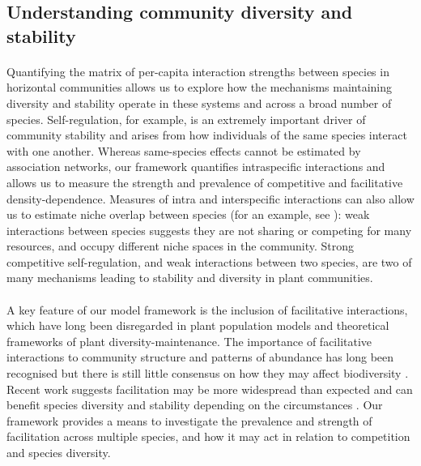 \documentclass[a4,12pt]{article}
\begin{document}
    \subsection{Understanding community diversity and stability}

        \paragraph{}
        Quantifying the matrix of per-capita interaction strengths between species in horizontal communities allows us to explore how the mechanisms maintaining diversity and stability operate in these systems and across a broad number of species. Self-regulation, for example, is an extremely important driver of community stability \parencite{Barabas2017} and arises from how individuals of the same species interact with one another. Whereas same-species effects cannot be estimated by association networks, our framework quantifies intraspecific interactions and allows us to measure the strength and prevalence of competitive and facilitative density-dependence. Measures of intra and interspecific interactions can also allow us to estimate niche overlap between species (for an example, see \textcite{Chu2015a}): weak interactions between species suggests they are not sharing or competing for many resources, and occupy different niche spaces in the community. Strong competitive self-regulation, and weak interactions between two species, are two of many mechanisms leading to stability and diversity in plant communities.

        \paragraph{}
        A key feature of our model framework is the inclusion of facilitative interactions, which have long been disregarded in plant population models and theoretical frameworks of plant diversity-maintenance. The importance of facilitative interactions to community structure and patterns of abundance has long been recognised \parencite{Callaway1997a} but there is still little consensus on how they may affect biodiversity \parencite{Bruno2003}. Recent work suggests facilitation may be more widespread than expected \parencite{Gross2015, Picoche2020} and can  benefit species diversity and stability depending on the circumstances \parencite{Coyte2015, Brooker2008}. Our framework provides a means to investigate the prevalence and strength of facilitation across multiple species, and how it may act in relation to competition and species diversity.  
        
\end{document}
